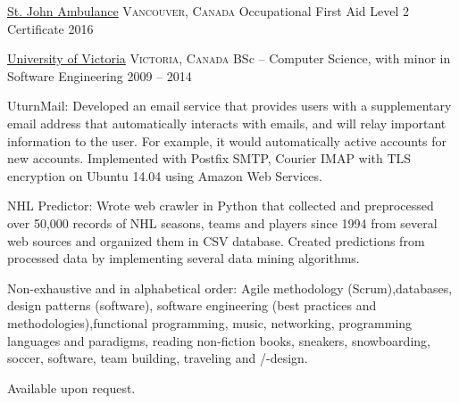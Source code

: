 \documentclass[10pt,a4paper]{article}
\begin{document}
\headedsection
  {\href{https://www.sja.ca}{St. John Ambulance}}
  {\textsc{Vancouver, Canada}} {
  \headedsubsection
    {{Occupational First Aid Level 2 Certificate}}
    {2016}
    {}
}

\vspace{0.5em}


\spacedhrule{1.6em}{-0.4em}


\headedsection
  {\href{https://www.uvic.ca/}{University of Victoria}}
  {\textsc{Victoria, Canada}} {
  \headedsubsection
    {BSc -- Computer Science, with minor in Software Engineering}
    {2009 -- 2014}
    {}
}

\spacedhrule{0.5em}{-0.4em}

\inlineheadsection
  {UturnMail:}
  {Developed an email service that provides users with a supplementary
email address that automatically interacts with emails, and will relay important information to the user. For example, it would automatically active accounts for new accounts.
Implemented with Postfix SMTP, Courier IMAP with TLS encryption on Ubuntu 14.04 using Amazon Web Services.}

\vspace{0.5em}
\inlineheadsection
  {NHL Predictor:}
  {Wrote web crawler in Python that collected and preprocessed over
50,000 records of NHL seasons, teams and players since 1994 from several web sources and organized them
in CSV database. Created predictions from processed data by implementing several data mining algorithms.}

\spacedhrule{1.6em}{-0.4em}


\inlineheadsection
  {Non-exhaustive and in alphabetical order:}
  {Agile methodology (Scrum),databases, design patterns (software), software engineering (best practices and methodologies),functional programming, music, networking, programming languages and paradigms, reading non-fiction books, sneakers, snowboarding, soccer, software, team building, traveling and /-design.}

\spacedhrule{1.6em}{-0.4em}



\inlineheadsection
  {Available upon request.}
\end{document}
